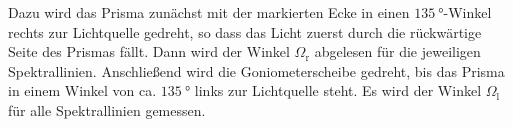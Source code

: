 Dazu wird das Prisma zunächst mit der markierten Ecke in einen $\SI{135}{°}$-Winkel rechts zur Lichtquelle gedreht, so dass das Licht zuerst durch die rückwärtige Seite des Prismas fällt.
Dann wird der Winkel $\Omega_{\text{r}}$ abgelesen für die jeweiligen Spektrallinien.
Anschließend wird die Goniometerscheibe gedreht, bis das Prisma in einem Winkel von ca. $\SI{135}{°}$ links zur Lichtquelle steht.
Es wird der Winkel $\Omega_{\text{l}}$ für alle Spektrallinien gemessen.
\FloatBarrier
